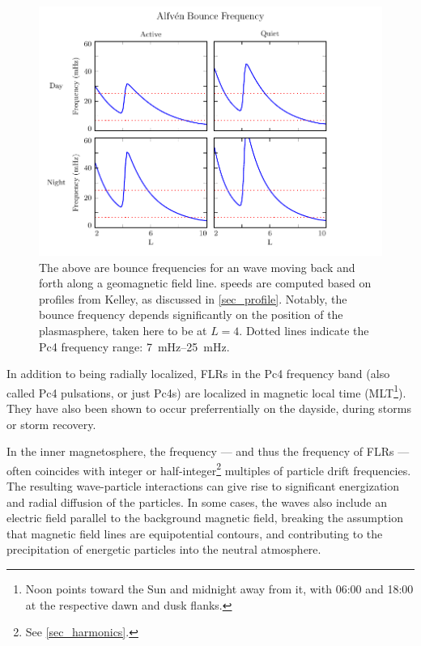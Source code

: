 \begin{figure}[!htb]
  \centering
  \includegraphics[width=\textwidth]{figures/fa.pdf}
  \caption[\Alfven Bounce Frequencies]{
    The above are bounce frequencies for an \Alfven wave moving back and forth
    along a geomagnetic field line. \Alfven speeds are computed based on
    profiles from Kelley\cite{kelley_1989}, as discussed in \cref{sec_profile}.
    Notably, the bounce frequency depends significantly on the position of the
    plasmasphere, taken here to be at $L=4$. Dotted lines indicate the Pc4
    frequency range: \SIrange{7}{25}{\mHz}. 
  }
  \label{fig_fa}
\end{figure}

In addition to being radially localized, FLRs in the Pc4 frequency band (also
called Pc4 pulsations, or just Pc4s) are localized in magnetic local time
(MLT\footnote{Noon points toward the Sun and midnight away from it, with 06:00
and 18:00 at the respective dawn and dusk flanks. }). They have also been shown
to occur preferrentially on the dayside, during storms or storm
recovery\cite{anderson_1990,dai_2015,engebretson_1992,kokubun_1989,liu_2009,
ukhorskiy_2005}. 

In the inner magnetosphere, the \Alfven frequency --- and thus the frequency of
FLRs --- often coincides with integer or half-integer\footnote{See
\cref{sec_harmonics}. } multiples of particle drift frequencies\cite{dai_2013}.
The resulting wave-particle interactions can give rise to significant
energization and radial diffusion of the particles. In some cases, the waves
also include an electric field parallel to the background magnetic field,
breaking the assumption that magnetic field lines are equipotential contours,
and contributing to the precipitation of energetic particles into the neutral
atmosphere\cite{goertz_1984,goertz_1979,thompson_1996,wygant_2002}. 

